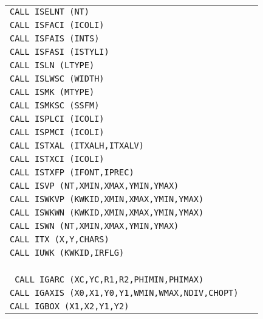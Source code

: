 \begin{longtable}{|>{\small\tt}p{.92\linewidth}r|}
CALL ISELNT (NT)                                      & \pageref{ISELNT} \\
CALL ISFACI (ICOLI)                                   & \pageref{ISFACI} \\
CALL ISFAIS (INTS)                                    & \pageref{ISFAIS} \\
CALL ISFASI (ISTYLI)                                  & \pageref{ISFASI} \\
CALL ISLN (LTYPE)                                     & \pageref{ISLN}   \\
CALL ISLWSC (WIDTH)                                   & \pageref{ISLWSC} \\
CALL ISMK (MTYPE)                                     & \pageref{ISMK}   \\
CALL ISMKSC (SSFM)                                    & \pageref{ISMKSC} \\
CALL ISPLCI (ICOLI)                                   & \pageref{ISPLCI} \\
CALL ISPMCI (ICOLI)                                   & \pageref{ISPMCI} \\
CALL ISTXAL (ITXALH,ITXALV)                           & \pageref{ISTXAL} \\
CALL ISTXCI (ICOLI)                                   & \pageref{ISTXCI} \\
CALL ISTXFP (IFONT,IPREC)                             & \pageref{ISTXFP} \\
CALL ISVP (NT,XMIN,XMAX,YMIN,YMAX)                    & \pageref{ISVP}   \\
CALL ISWKVP (KWKID,XMIN,XMAX,YMIN,YMAX)               & \pageref{ISWKVP} \\
CALL ISWKWN (KWKID,XMIN,XMAX,YMIN,YMAX)               & \pageref{ISWKWN} \\
CALL ISWN (NT,XMIN,XMAX,YMIN,YMAX)                    & \pageref{ISWN}   \\
CALL ITX (X,Y,CHARS)                                  & \pageref{ITX}    \\
CALL IUWK (KWKID,IRFLG)                               & \pageref{IUWK}   \\
\hline
\multicolumn{2}{|c|}{\bf HIGZ functions}                                 \\
\hline
CALL IGARC (XC,YC,R1,R2,PHIMIN,PHIMAX)                & \pageref{IGARC}  \\
CALL IGAXIS (X0,X1,Y0,Y1,WMIN,WMAX,NDIV,CHOPT)        & \pageref{IGAXIS} \\
CALL IGBOX (X1,X2,Y1,Y2)                              & \pageref{IGBOX}  \\

\end{longtable}
